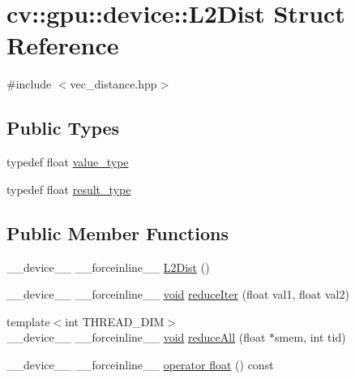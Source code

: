 \hypertarget{structcv_1_1gpu_1_1device_1_1L2Dist}{\section{cv\-:\-:gpu\-:\-:device\-:\-:L2\-Dist Struct Reference}
\label{structcv_1_1gpu_1_1device_1_1L2Dist}
}


{\ttfamily \#include $<$vec\-\_\-distance.\-hpp$>$}

\subsection*{Public Types}
\begin{DoxyCompactItemize}
\item 
typedef float \hyperlink{structcv_1_1gpu_1_1device_1_1L2Dist_a6a5a3749b1920972553cb24a994d0b92}{value\-\_\-type}
\item 
typedef float \hyperlink{structcv_1_1gpu_1_1device_1_1L2Dist_ac20ae62819b88997b7239f4b7de8a033}{result\-\_\-type}
\end{DoxyCompactItemize}
\subsection*{Public Member Functions}
\begin{DoxyCompactItemize}
\item 
\-\_\-\-\_\-device\-\_\-\-\_\- \-\_\-\-\_\-forceinline\-\_\-\-\_\- \hyperlink{structcv_1_1gpu_1_1device_1_1L2Dist_a2e7e6ad9954f42ba30cce8c602ee1fca}{L2\-Dist} ()
\item 
\-\_\-\-\_\-device\-\_\-\-\_\- \-\_\-\-\_\-forceinline\-\_\-\-\_\- \hyperlink{legacy_8hpp_a8bb47f092d473522721002c86c13b94e}{void} \hyperlink{structcv_1_1gpu_1_1device_1_1L2Dist_a70fd7af2c5bc5697a673c87bb3eaba2f}{reduce\-Iter} (float val1, float val2)
\item 
{\footnotesize template$<$int T\-H\-R\-E\-A\-D\-\_\-\-D\-I\-M$>$ }\\\-\_\-\-\_\-device\-\_\-\-\_\- \-\_\-\-\_\-forceinline\-\_\-\-\_\- \hyperlink{legacy_8hpp_a8bb47f092d473522721002c86c13b94e}{void} \hyperlink{structcv_1_1gpu_1_1device_1_1L2Dist_a2b3f860d74c9a6a523f2a60371f3f837}{reduce\-All} (float $\ast$smem, int tid)
\item 
\-\_\-\-\_\-device\-\_\-\-\_\- \-\_\-\-\_\-forceinline\-\_\-\-\_\- \hyperlink{structcv_1_1gpu_1_1device_1_1L2Dist_ac9cb58f66c1cacc23f93e276ccded47e}{operator float} () const 
\end{DoxyCompactItemize}
